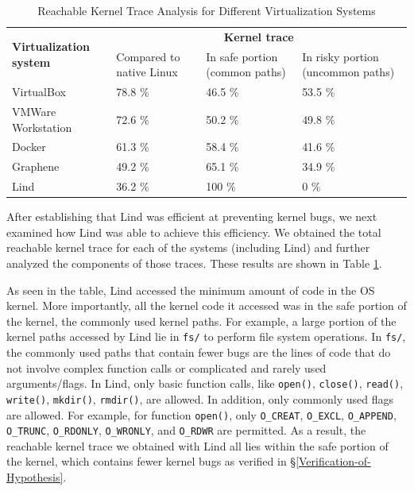 \begin{table}
\centering
\scriptsize
\caption{Reachable Kernel Trace Analysis for Different Virtualization
Systems}
\begin{tabular}{|l|l|l|l|}
  \hline
  \multirow{3}{1.5cm}{\bf Virtualization system} & \multicolumn{3}{c|}{\bf Kernel trace} \\ \cline{2-4}
  & \multirow{2}{1.5cm}{Compared to native Linux} & \multirow{2}{1.5cm}{In safe portion
  (common paths)} & \multirow{2}{1cm}{In risky portion (uncommon paths)} \\
  & & & \\  \hline
  VirtualBox & 78.8 \% & 46.5 \% & 53.5 \% \\
  \hline
  \multirow{2}{1.5cm}{VMWare Workstation} & \multirow{2}{*}{72.6 \%} &
  \multirow{2}{*}{50.2 \%} & \multirow{2}{*}{49.8 \%} \\
  & & & \\   \hline
  Docker & 61.3 \% & 58.4 \% & 41.6 \% \\
  \hline
  Graphene & 49.2 \% & 65.1 \% & 34.9 \% \\
  \hline
  Lind & 36.2 \% & 100 \% & 0 \% \\
  \hline
\end{tabular}
\label{table:trace-systems}
\end{table}

After establishing that Lind was efficient at preventing kernel bugs, we next
examined how Lind was able to achieve this efficiency.
We obtained the total reachable kernel trace for
each of the systems (including Lind)
and further analyzed the components of those traces. These results
are shown in Table \ref{table:trace-systems}.

As seen in the table, Lind accessed the minimum amount of code in the OS
kernel. More importantly,
all the kernel code it accessed was in the safe portion of the kernel, the
commonly used kernel paths.
For example, a large portion of the kernel paths accessed by Lind lie in
\texttt{fs/} to perform file system operations.
In \texttt{fs/}, the commonly used paths that contain
fewer bugs are the lines of code that do not involve complex function calls
or complicated and rarely used arguments/flags. In Lind, only basic function calls,
like \texttt{open()}, \texttt{close()}, \texttt{read()}, \texttt{write()}, \texttt{mkdir()},
\texttt{rmdir()}, are allowed. In addition, only commonly used flags are allowed.
For example, for function \texttt{open()}, only
\texttt{O\_CREAT}, \texttt{O\_EXCL}, \texttt{O\_APPEND}, \texttt{O\_TRUNC},
\texttt{O\_RDONLY}, \texttt{O\_WRONLY}, and \texttt{O\_RDWR} are permitted.
As a result, the reachable kernel trace we obtained with Lind all lies within the safe
portion of the kernel, which contains fewer kernel bugs
as verified in \S{\ref{Verification-of-Hypothesis}}.

